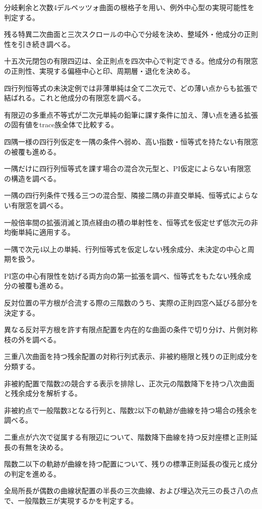 \documentclass[11pt,a4paper]{ltjsarticle}
\begin{document}
分岐剰余と次数4デルペッツォ曲面の根格子を用い、例外中心型の実現可能性を判定する。

残る特異二次曲面と三次スクロールの中心で分岐を決め、整域外・他成分の正則性を引き続き調べる。





十五次元閉包の有限四辺は、全正則点を四次中心で判定できる。他成分の有限窓の正則性、実現する偏極中心と印、周期層・退化を決める。

四行列恒等式の未決定例では非薄単純は全て二次元で、どの薄い点からも拡張で結ばれる。これと他成分の有限窓を調べる。

有限辺の多重点不等式が二次元単純の鉛筆に課す条件に加え、薄い点を通る拡張の固有値をtrace族全体で比較する。

四隅一様の四行列仮定を一隅の条件へ弱め、高い指数・恒等式を持たない有限窓の被覆も進める。

一隅だけに四行列恒等式を課す場合の混合次元型と、PI仮定によらない有限窓の構造を調べる。

一隅の四行列条件で残る三つの混合型、隣接二隅の非直交単純、恒等式によらない有限窓を調べる。

一般倍率間の拡張消滅と頂点経由の積の単射性を、恒等式を仮定せず低次元の非均衡単純に適用する。

一隅で次元4以上の単純、行列恒等式を仮定しない残余成分、未決定の中心と周期を扱う。

PI窓の中心有限性を妨げる両方向の第一拡張を調べ、恒等式をもたない残余成分の被覆も進める。

反対位置の平方根が合流する際の三階数のうち、実際の正則四窓へ延びる部分を決定する。

異なる反対平方根を許す有限点配置を内在的な曲面の条件で切り分け、片側対称枝の外を調べる。

三重八次曲面を持つ残余配置の対称行列式表示、非被約極限と残りの正則成分を分類する。

非被約配置で階数2の競合する表示を排除し、正次元の階数降下を持つ八次曲面と残余成分を解析する。

非被約点で一般階数3となる行列と、階数2以下の軌跡が曲線を持つ場合の残余を調べる。

二重点が六次で従属する有限辺について、階数降下曲線を持つ反対座標と正則延長の有無を決める。

階数二以下の軌跡が曲線を持つ配置について、残りの標準正則延長の復元と成分の判定を進める。

全局所長が偶数の曲線状配置の半長の三次曲線、および埋込次元三の長さ八の点で、一般階数三が実現するかを判定する。
\end{document}

